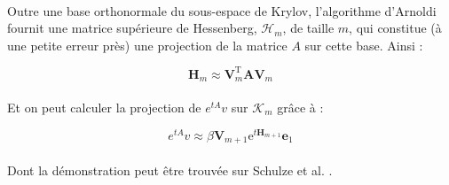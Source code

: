 \vspace{0.3cm}


\vspace{0.3cm}

\paragraph{}
Outre une base orthonormale du sous-espace de Krylov, l'algorithme d'Arnoldi fournit une matrice supérieure de Hessenberg, $\mathcal{H}_{m}$, de taille $m$, qui constitue (à une petite erreur près) une projection de la matrice $A$ sur cette base. Ainsi : 

\begin{equation} 
    \mathbf{H}_{m} \approx \mathbf{V}_{m}^{\mathrm{T}} \mathbf{A} \mathbf{V}_{m}
\end{equation}

\paragraph{}
Et on peut calculer la projection de $e^{tA} v$ sur $\mathcal{K}_{m}$ grâce à :

\begin{equation} 
    e^{tA} v \approx \beta \mathbf{V}_{m+1} \mathrm{e}^{t \mathbf{H}_{m+1}} \mathbf{e}_{1}
\end{equation}

\paragraph{}
Dont la démonstration peut être trouvée sur Schulze et al. \cite{Krylov:1}.

